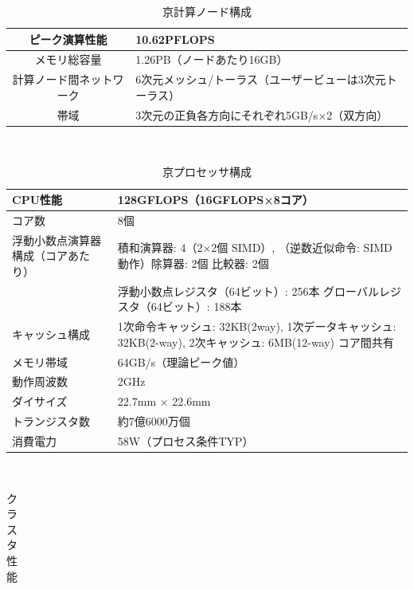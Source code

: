 \begin{table}[t]
  \begin{center}
    \begin{tabular}{|c|p{12cm}|}
      \hline
      ピーク演算性能 & 10.62PFLOPS \\ \hline
      メモリ総容量 & 1.26PB（ノードあたり16GB）\\ \hline
      計算ノード間ネットワーク & 6次元メッシュ/トーラス（ユーザービューは3次元トーラス）\\ \hline
      帯域 & 3次元の正負各方向にそれぞれ5GB/s×2（双方向）\\ \hline
    \end{tabular}
    \caption{京計算ノード構成}
    \label{table:k}
  \end{center}
\end{table}~\\
\begin{table}[t]
  \begin{center}
    \begin{tabular}{|l|p{10cm}|}
      \hline
      CPU性能 & 128GFLOPS（16GFLOPS×8コア）\\ \hline
      コア数 & 8個\\ \hline
      浮動小数点演算器構成（コアあたり）& 積和演算器: 4（2×2個 SIMD）, （逆数近似命令: SIMD 動作）除算器: 2個 比較器: 2個\\ \cline{1-2}
      & 浮動小数点レジスタ（64ビット）: 256本 グローバルレジスタ（64ビット）: 188本\\ \cline{1-2}
      キャッシュ構成 & 1次命令キャッシュ: 32KB(2way), 1次データキャッシュ: 32KB(2-way), 2次キャッシュ: 6MB(12-way) コア間共有\\ \hline
      メモリ帯域 & 64GB/s（理論ピーク値）\\ \hline
      動作周波数 & 2GHz \\ \hline
      ダイサイズ & 22.7mm × 22.6mm \\ \hline
      トランジスタ数 & 約7億6000万個 \\ \hline
      消費電力 & 58W（プロセス条件TYP）\\ \hline
    \end{tabular}
    \caption{京プロセッサ構成}
    \label{table:k-processor}
  \end{center}
\end{table}~\\
\begin{table}[htb]
  \begin{center}
    \begin{tabular}{|c|p{12cm}|}
    \end{tabular}
    \caption{クラスタ性能}
    \label{table:cluster}
  \end{center}
\end{table}~\\
